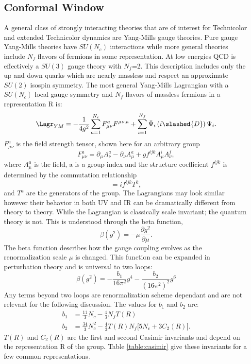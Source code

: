 \subsection{Conformal Window}
\label{sec:sec:conformalwindow}
A general class of strongly interacting theories that are of interest for Technicolor and extended Technicolor dynamics are Yang-Mills gauge theories.
Pure gauge Yang-Mills theories have $SU(N_c)$ interactions while more general theories include $N_f$ flavors of fermions in some representation.
At low energies QCD is effectively a $SU(3)$ gauge theory with $N_f$=2.
This description includes only the up and down quarks which are nearly massless and respect an approximate $SU(2)$ isospin symmetry.
The most general Yang-Mills Lagrangian with a $SU(N_c)$ local gauge symmetry and $N_f$ flavors of massless fermions in a representation R is:
\begin{equation}
  \Lagr_{YM}=-\frac{1}{4g^2}\sum\limits_{a=1}^{N_c} F^a_{\mu\nu}F^{\mu\nu,a}+\sum\limits_{i=1}^{N_f} \bar\Psi_i\left(i\slashed{D}\right)\Psi_i.  
\end{equation}
$F^a_{\mu\nu}$ is the field strength tensor, shown here for an arbitrary group
\begin{equation}
  F^a_{\mu\nu}=\partial_\mu A^a_\nu-\partial_\nu A^a_\mu + gf^{ijk}A^i_\mu A^j_\nu,
\end{equation}
where $A^a_\mu$ is the field, a is a group index and the structure coefficient $f^{ijk}$ is determined by the commutation relationship
\begin{equation}
  [T^i,T^j]=if^{ijk}T^k,
\end{equation}
and $T^a$ are the generators of the group.
The Lagrangians may look similar however their behavior in both UV and IR can be dramatically different from theory to theory.
While the Lagrangian is classically scale invariant; the quantum theory is not.
This is understood through the beta function,
\begin{equation}
  \beta (g^2)=-\mu\frac{\partial g^2}{\partial \mu}.
\end{equation}
The beta function describes how the gauge coupling evolves as the renormalization scale $\mu$ is changed.
This function can be expanded in perturbation theory and is universal to two loops:
\begin{equation}
  \beta\left(g^2\right)=-\frac{b_1}{16\pi^2}g^4-\frac{b_2}{(16\pi^2)^2}g^6
\end{equation}
Any terms beyond two loops are renormalization scheme dependant and are not relevant for the following discussion.
The values for $b_1$ and $b_2$ are:
\begin{equation}
  \label{eqn:b1b2}
  \begin{aligned}
    b_1&=\frac{11}{3}N_c-\frac{4}{3}N_fT(R)\\
    b_2&=\frac{34}{3}N_c^2-\frac{4}{3}T(R)N_f\Big[5N_c+3C_2(R)\Big].
  \end{aligned}
\end{equation}
$T(R)$ and $C_2(R)$ are the first and second Casimir invariants and depend on the representation R of the group.
Table \ref{table:casimir} give these invariants for a few common representations.

